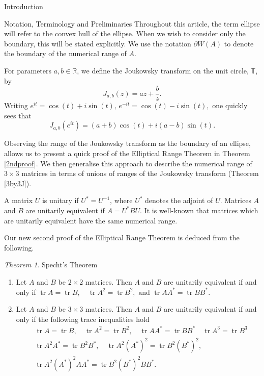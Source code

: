 \documentclass[12pt]{article}
\theoremstyle{plain}
\theoremstyle{definition}
\theoremstyle{remark}
\newtheorem{Theorem}{Theorem}[section]
\numberwithin{equation}{section}
\begin{document}
\begin{section}{Introduction}
\begin{subsection}{Notation, Terminology and Preliminaries}
Throughout this article, the term ellipse will refer to the convex hull of the ellipse. When we wish to consider only the boundary, this will be stated explicitly. We use the notation $\partial W(A)$ to denote the boundary of the numerical range of $A$.


For parameters $a, b \in \mathbb{R}$, we define the Joukowsky transform on the unit circle, $\mathbb{T}$, by
\[
J_{a,b}(z) = az + \frac{b}{z}.
\]
Writing $
e^{it} =  \cos (t) + i  \sin (t), \,  e^{-it} =  \cos (t) - i  \sin (t),$ one quickly sees that
\begin{equation}\label{Jtransform}
    J_{a,b}(e^{it}) = (a+b) \cos (t) + i(a-b) \sin (t).
\end{equation}


Observing the range of the Joukowsky transform as the boundary of an ellipse, allows us to present a quick proof of the Elliptical Range Theorem in Theorem \ref{2ndproof}. We then generalise this approach to describe the numerical range of $3 \times 3$ matrices in terms of unions of ranges of the Joukowsky transform (Theorem \ref{3by3J}).





A matrix $U$ is unitary if $U^* = U^{-1}$, where $U^*$ denotes the adjoint of $U$. Matrices $A$ and $B$ are unitarily equivalent if $A = U^*BU$. It is well-known that matrices which are unitarily equivalent have the same numerical range.


Our new second proof of the Elliptical Range Theorem is deduced from the following.



\begin{Theorem}{Specht's Theorem}\label{Specht}
    \begin{enumerate}
        \item Let $A$ and $B$ be $2 \times 2$ matrices. Then $A$ and $B$ are unitarily equivalent if and only if $\operatorname{tr} A=\operatorname{tr} B, \quad \operatorname{tr} A^2=\operatorname{tr} B^2,  \text { and }\operatorname{tr} A A^*=\operatorname{tr} B B^*$.
        \item Let  $A$ and $B$ be $3 \times 3$ matrices. Then $A$ and $B$ are unitarily equivalent if and only if the following trace inequalities hold \begin{align}\label{all}
    &\operatorname{tr} A=\operatorname{tr} B, \quad \operatorname{tr} A^2=\operatorname{tr} B^2, \quad \operatorname{tr} A A^*=\operatorname{tr} B B^*  \quad \operatorname{tr} A^3=\operatorname{tr} B^3 \\
    &\operatorname{tr} A^2 A^*=\operatorname{tr} B^2 B^*,  \quad \operatorname{tr} A^2\left(A^*\right)^2=\operatorname{tr} B^2\left(B^*\right)^2, \quad \\ &\operatorname{tr} A^2\left(A^*\right)^2 A A^*=\operatorname{tr} B^2\left(B^*\right)^2 B B^*.
    \end{align}
    \end{enumerate}
\end{Theorem}


\end{subsection}
\end{section}
\end{document}
